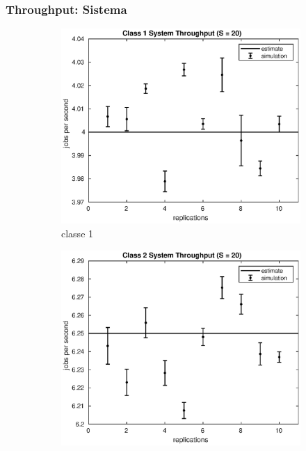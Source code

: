 \subsubsection{Throughput: Sistema}
%
\begin{figure}[!h]
\centering
%
\begin{subfigure}[t]{0.49\textwidth}
\includegraphics[width=\textwidth]{figures/simul/20_500K_x1}
\caption{classe 1}
\label{20_x1}
\end{subfigure}
%
\begin{subfigure}[t]{0.49\textwidth}
\includegraphics[width=\textwidth]{figures/simul/20_500K_x2}

\end{subfigure}
\end{figure}

